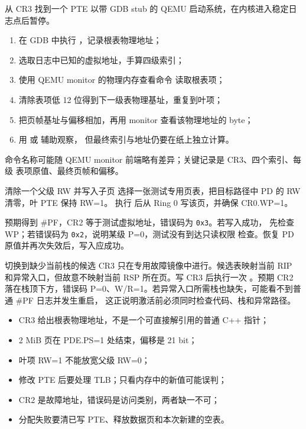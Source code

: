 \begin{experimentbox}{从 CR3 找到一个 PTE}
以带 GDB stub 的 QEMU 启动系统，在内核进入稳定日志点后暂停。

\begin{enumerate}[leftmargin=2.2em]
  \item 在 GDB 中执行 ，记录根表物理地址；
  \item 选取日志中已知的虚拟地址，手算四级索引；
  \item 使用 QEMU monitor 的物理内存查看命令
     读取根表项；
  \item 清除表项低 12 位得到下一级表物理基址，重复到叶项；
  \item 把页帧基址与偏移相加，再用 monitor 查看该物理地址的 byte；
  \item 用  或  辅助观察，
    但最终索引与地址仍要在纸上独立计算。
\end{enumerate}

命令名称可能随 QEMU monitor 前端略有差异；关键记录是 CR3、四个索引、每级
表项原值、最终页帧和偏移。
\end{experimentbox}

\begin{faultinjectionbox}{清除一个父级 RW 并写入子页}
选择一张测试专用页表，把目标路径中 PD 的 RW 清零，叶 PTE 保持 RW=1。
执行  后从 Ring 0 写该页，并确保 CR0.WP=1。

预期得到 \#PF，CR2 等于测试虚拟地址，错误码为 \texttt{0x3}。若写入成功，
先检查 WP；若错误码为 \texttt{0x2}，说明某级 P=0，测试没有到达只读权限
检查。恢复 PD 原值并再次失效后，写入应成功。
\end{faultinjectionbox}

\begin{faultinjectionbox}{切换到缺少当前栈的候选 CR3}
只在专用故障镜像中进行。候选表映射当前 RIP 和异常入口，但故意不映射当前
RSP 所在页。写 CR3 后执行一次 。预期 CR2 落在栈顶下方，错误码
P=0、W/R=1。若异常入口所需栈也缺失，可能看不到普通 \#PF 日志并发生重启，
这正说明激活前必须同时检查代码、栈和异常路径。
\end{faultinjectionbox}

\begin{pitfallbox}
\begin{itemize}[leftmargin=2.2em]
  \item CR3 给出根表物理地址，不是一个可直接解引用的普通 C++ 指针；
  \item 2 MiB 页在 PDE.PS=1 处结束，偏移是 21 bit；
  \item 叶项 RW=1 不能放宽父级 RW=0；
  \item 修改 PTE 后要处理 TLB；只看内存中的新值可能误判；
  \item CR2 是故障地址，错误码是访问类别，两者缺一不可；
  \item 分配失败要清已写 PTE、释放数据页和本次新建的空表。
\end{itemize}
\end{pitfallbox}

